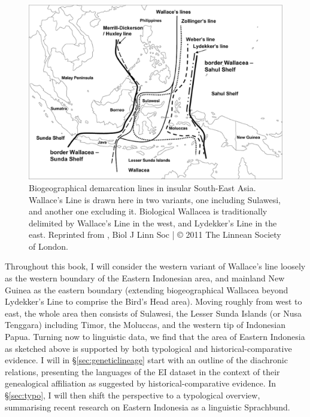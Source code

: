 \begin{figure}

\includegraphics[width=1.0\textwidth]{figures/Wallacea2.eps}
\caption[Biogeographical demarcation lines in insular South-East Asia]{Biogeographical demarcation lines in insular South-East Asia. Wallace's Line is drawn here in two variants, one including Sulawesi, and another one excluding it. Biological Wallacea is traditionally delimited by Wallace's Line in the west, and Lydekker's Line in the east. Reprinted from \citealt{Welzen2011}, Biol J Linn Soc | © 2011 The Linnean Society of London.}\label{map:wallacea}

\end{figure}

Throughout this book, I will consider the western variant of Wallace's line loosely as the western boundary of the Eastern Indonesian area, and mainland New Guinea as the eastern boundary (extending biogeographical Wallacea beyond Lydekker's Line to comprise the Bird's Head area). Moving roughly from west to east, the whole area then consists of Sulawesi, the Lesser Sunda Islands (or Nusa Tenggara) including Timor, the Moluccas, and the western tip of Indonesian Papua. Turning now to linguistic data, we find that the area of Eastern Indonesia as sketched above is supported by both typological and historical-comparative evidence. I will in §\ref{sec:geneticlineage} start with an outline of the diachronic relations, presenting the languages of the EI dataset in the context of their genealogical affiliation as suggested by historical-comparative evidence. In §\ref{sec:typo}, I will then shift the perspective to a typological overview, summarising recent research on Eastern Indonesia as a linguistic Sprachbund. 

